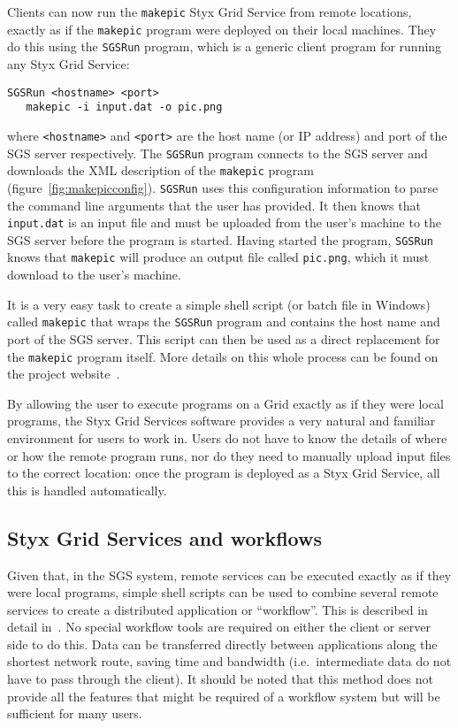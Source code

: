 \documentclass[a4paper]{article}
\begin{document}
\begin{multicols}{2}
Clients can now run the {\tt makepic} Styx Grid Service from remote locations, exactly as if the {\tt makepic} program were deployed on their local machines.  They do this using the {\tt SGSRun} program, which is a generic client program for running any Styx Grid Service:

\begin{verbatim}
SGSRun <hostname> <port>
   makepic -i input.dat -o pic.png
\end{verbatim}
where {\tt <hostname>} and {\tt <port>} are the host name (or IP address) and port of the SGS server respectively.  The {\tt SGSRun} program connects to the SGS server and downloads the XML description of the {\tt makepic} program  (figure~\ref{fig:makepicconfig}).  {\tt SGSRun} uses this configuration information to parse the command line arguments that the user has provided.  It then knows that {\tt input.dat} is an input file and must be uploaded from the user's machine to the SGS server before the program is started.  Having started the program, {\tt SGSRun} knows that {\tt makepic} will produce an output file called {\tt pic.png}, which it must download to the user's machine.

It is a very easy task to create a simple shell script (or batch file in Windows) called {\tt makepic} that wraps the {\tt SGSRun} program and contains the host name and port of the SGS server.  This script can then be used as a direct replacement for the {\tt makepic} program itself.  More details on this whole process can be found on the project website~\cite{sgswebsite}.

By allowing the user to execute programs on a Grid exactly as if they were local programs, the Styx Grid Services software provides a very natural and familiar environment for users to work in.  Users do not have to know the details of where or how the remote program runs, nor do they need to manually upload input files to the correct location: once the program is deployed as a Styx Grid Service, all this is handled automatically.

\subsection{Styx Grid Services and workflows}
Given that, in the SGS system, remote services can be executed exactly as if they were local programs, simple shell scripts can be used to combine several remote services to create a distributed application or ``workflow''.  This is described in detail in~\cite{blower:2006}.  No special workflow tools are required on either the client or server side to do this.  Data can be transferred directly between applications along the shortest network route, saving time and bandwidth (i.e.\ intermediate data do not have to pass through the client).  It should be noted that this method does not provide all the features that might be required of a workflow system but will be sufficient for many users.


\end{multicols}
\end{document}
